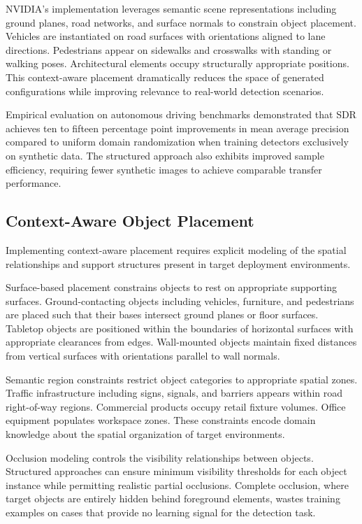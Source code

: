 NVIDIA's implementation leverages semantic scene representations including ground planes, road networks, and surface normals to constrain object placement. Vehicles are instantiated on road surfaces with orientations aligned to lane directions. Pedestrians appear on sidewalks and crosswalks with standing or walking poses. Architectural elements occupy structurally appropriate positions. This context-aware placement dramatically reduces the space of generated configurations while improving relevance to real-world detection scenarios.

Empirical evaluation on autonomous driving benchmarks demonstrated that SDR achieves ten to fifteen percentage point improvements in mean average precision compared to uniform domain randomization when training detectors exclusively on synthetic data. The structured approach also exhibits improved sample efficiency, requiring fewer synthetic images to achieve comparable transfer performance.

\subsection{Context-Aware Object Placement}

Implementing context-aware placement requires explicit modeling of the spatial relationships and support structures present in target deployment environments.

Surface-based placement constrains objects to rest on appropriate supporting surfaces. Ground-contacting objects including vehicles, furniture, and pedestrians are placed such that their bases intersect ground planes or floor surfaces. Tabletop objects are positioned within the boundaries of horizontal surfaces with appropriate clearances from edges. Wall-mounted objects maintain fixed distances from vertical surfaces with orientations parallel to wall normals.

Semantic region constraints restrict object categories to appropriate spatial zones. Traffic infrastructure including signs, signals, and barriers appears within road right-of-way regions. Commercial products occupy retail fixture volumes. Office equipment populates workspace zones. These constraints encode domain knowledge about the spatial organization of target environments.

Occlusion modeling controls the visibility relationships between objects. Structured approaches can ensure minimum visibility thresholds for each object instance while permitting realistic partial occlusions. Complete occlusion, where target objects are entirely hidden behind foreground elements, wastes training examples on cases that provide no learning signal for the detection task.

